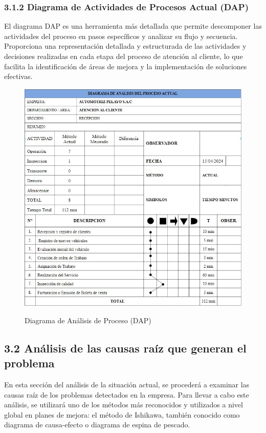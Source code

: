 \subsubsection*{3.1.2 Diagrama de Actividades de Procesos Actual (DAP)}
El diagrama DAP es una herramienta más detallada que permite descomponer las actividades del proceso en pasos específicos y analizar su flujo y secuencia. Proporciona una representación detallada y estructurada de las actividades y decisiones realizadas en cada etapa del proceso de atención al cliente, lo que facilita la identificación de áreas de mejora y la implementación de soluciones efectivas.

\begin{figure}[H]
    \caption[Diagrama de Análisis de Proceso (DAP)]{Diagrama de Análisis de Proceso (DAP)}
    \includegraphics[width=1\textwidth]{imagenes/cap3/DAPcap3captura.jpg}
    \label{fig:DiagramaDAP}
\end{figure}

\subsection{3.2 Análisis de las causas raíz que generan el problema}
En esta sección del análisis de la situación actual, se procederá a examinar las causas raíz de los problemas detectados en la empresa. Para llevar a cabo este análisis, se utilizará uno de los métodos más reconocidos y utilizados a nivel global en planes de mejora: el método de Ishikawa, también conocido como diagrama de causa-efecto o diagrama de espina de pescado.
